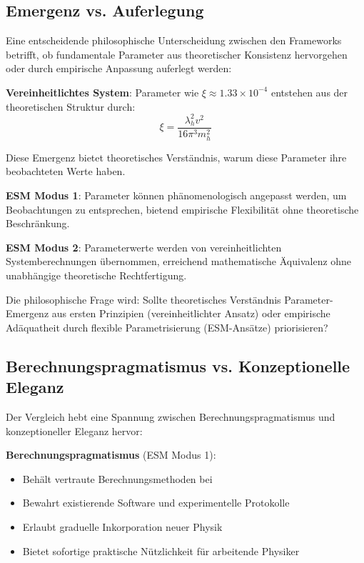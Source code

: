 \documentclass[12pt,a4paper]{article}
\newcommand{\xipar}{\xi}
\begin{document}
	\subsection{Emergenz vs. Auferlegung}
	\label{subsec:emergence_imposition}
	
	Eine entscheidende philosophische Unterscheidung zwischen den Frameworks betrifft, ob fundamentale Parameter aus theoretischer Konsistenz hervorgehen oder durch empirische Anpassung auferlegt werden:
	
	\textbf{Vereinheitlichtes System}: Parameter wie $\xipar \approx 1.33 \times 10^{-4}$ entstehen aus der theoretischen Struktur durch:
	\begin{equation}
		\xipar = \frac{\lambda_h^2 v^2}{16\pi^3 m_h^2}
	\end{equation}
	
	Diese Emergenz bietet theoretisches Verständnis, warum diese Parameter ihre beobachteten Werte haben.
	
	\textbf{ESM Modus 1}: Parameter können phänomenologisch angepasst werden, um Beobachtungen zu entsprechen, bietend empirische Flexibilität ohne theoretische Beschränkung.
	
	\textbf{ESM Modus 2}: Parameterwerte werden von vereinheitlichten Systemberechnungen übernommen, erreichend mathematische Äquivalenz ohne unabhängige theoretische Rechtfertigung.
	
	Die philosophische Frage wird: Sollte theoretisches Verständnis Parameter-Emergenz aus ersten Prinzipien (vereinheitlichter Ansatz) oder empirische Adäquatheit durch flexible Parametrisierung (ESM-Ansätze) priorisieren?
	
	\subsection{Berechnungspragmatismus vs. Konzeptionelle Eleganz}
	\label{subsec:pragmatism_vs_elegance}
	
	Der Vergleich hebt eine Spannung zwischen Berechnungspragmatismus und konzeptioneller Eleganz hervor:
	
	\textbf{Berechnungspragmatismus} (ESM Modus 1):
	\begin{itemize}
		\item Behält vertraute Berechnungsmethoden bei
		\item Bewahrt existierende Software und experimentelle Protokolle
		\item Erlaubt graduelle Inkorporation neuer Physik
		\item Bietet sofortige praktische Nützlichkeit für arbeitende Physiker
	\end{itemize}
	
\end{document}
